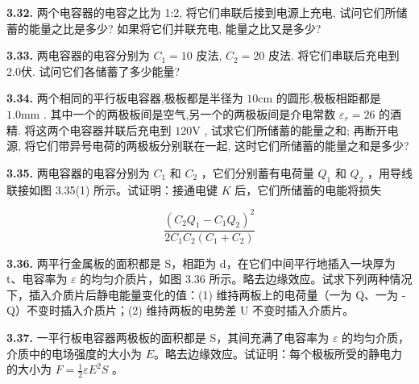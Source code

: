 \begin{center}
\end{center}

\vfill
\newpage

\textbf{3.32.} 两个电容器的电容之比为 1:2, 将它们串联后接到电源上充电, 试问它们所储蓄的能量之比是多少? 如果将它们并联充电, 能量之比又是多少?

\vfill
\newpage

\textbf{3.33.} 两电容器的电容分别为 $C_1 = 10$ 皮法, $C_2 = 20$ 皮法. 将它们串联后充电到2.0伏. 试问它们各储蓄了多少能量?

\vfill
\newpage

\textbf{3.34.} 两个相同的平行板电容器,极板都是半径为 $10\mathrm{cm}$ 的圆形,极板相距都是 $1.0\mathrm{mm}$ . 其中一个的两极板间是空气,另一个的两极板间是介电常数 $\varepsilon_{r} = 26$ 的酒精. 将这两个电容器并联后充电到 $120\mathrm{V}$ , 试求它们所储蓄的能量之和; 再断开电源, 将它们带异号电荷的两极板分别联在一起, 这时它们所储蓄的能量之和是多少?

\vfill
\newpage

\textbf{3.35.} 两电容器的电容分别为 $C_{1}$ 和 $C_{2}$ ，它们分别蓄有电荷量 $Q_{1}$ 和 $Q_{2}$ ，用导线联接如图 3.35(1) 所示。试证明：接通电键 $K$ 后，它们所储蓄的电能将损失

\[
\frac {(C _ {2} Q _ {1} - C _ {1} Q _ {2}) ^ {2}}{2 C _ {1} C _ {2} (C _ {1} + C _ {2})}
\]

\begin{center}
\end{center}

\vfill
\newpage

\textbf{3.36.} 两平行金属板的面积都是 S，相距为 d，在它们中间平行地插入一块厚为 t、电容率为 $\varepsilon$ 的均匀介质片，如图 3.36 所示。略去边缘效应。试求下列两种情况下，插入介质片后静电能量变化的值：(1) 维持两板上的电荷量（一为 Q、一为 -Q）不变时插入介质片；(2) 维持两板的电势差 U 不变时插入介质片。

\begin{center}
\end{center}

\vfill
\newpage

\textbf{3.37.} 一平行板电容器两极板的面积都是 S，其间充满了电容率为 $\varepsilon$ 的均匀介质，介质中的电场强度的大小为 $E$。略去边缘效应。试证明：每个极板所受的静电力的大小为 $\displaystyle F = \frac{1}{2} \varepsilon E^{2} S$ 。

